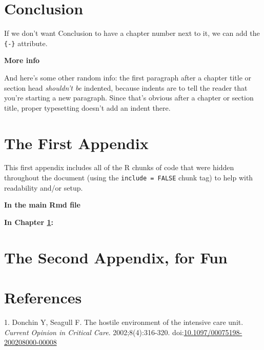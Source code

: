 \documentclass[12pt,twoside]{fmupthesis}
\begin{document}
\hypertarget{conclusion}{%
\chapter*{Conclusion}\label{conclusion}}

If we don't want Conclusion to have a chapter number next to it, we can add the \texttt{\{-\}} attribute.

\textbf{More info}

And here's some other random info: the first paragraph after a chapter title or section head \emph{shouldn't be} indented, because indents are to tell the reader that you're starting a new paragraph. Since that's obvious after a chapter or section title, proper typesetting doesn't add an indent there.

\appendix

\hypertarget{the-first-appendix}{%
\chapter{The First Appendix}\label{the-first-appendix}}

This first appendix includes all of the R chunks of code that were hidden throughout the document (using the \texttt{include\ =\ FALSE} chunk tag) to help with readability and/or setup.

\textbf{In the main Rmd file}

\textbf{In Chapter \ref{the-first-appendix}:}

\hypertarget{the-second-appendix-for-fun}{%
\chapter{The Second Appendix, for Fun}\label{the-second-appendix-for-fun}}

\backmatter

\hypertarget{references}{%
\chapter*{References}\label{references}}


\noindent

\setlength{\parindent}{-0.20in}
\setlength{\leftskip}{0.20in}
\setlength{\parskip}{8pt}

\hypertarget{refs}{}
\leavevmode\hypertarget{ref-donchin2002}{}%
1. Donchin Y, Seagull F. The hostile environment of the intensive care unit. \emph{Current Opinion in Critical Care}. 2002;8(4):316-320. doi:\href{https://doi.org/10.1097/00075198-200208000-00008}{10.1097/00075198-200208000-00008}
\end{document}
